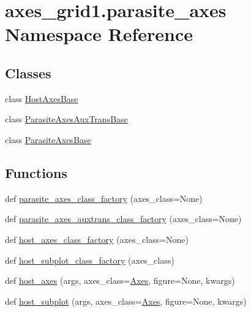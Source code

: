 \hypertarget{namespaceaxes__grid1_1_1parasite__axes}{}\section{axes\+\_\+grid1.\+parasite\+\_\+axes Namespace Reference}
\label{namespaceaxes__grid1_1_1parasite__axes}
\subsection*{Classes}
\begin{DoxyCompactItemize}
\item 
class \hyperlink{classaxes__grid1_1_1parasite__axes_1_1HostAxesBase}{Host\+Axes\+Base}
\item 
class \hyperlink{classaxes__grid1_1_1parasite__axes_1_1ParasiteAxesAuxTransBase}{Parasite\+Axes\+Aux\+Trans\+Base}
\item 
class \hyperlink{classaxes__grid1_1_1parasite__axes_1_1ParasiteAxesBase}{Parasite\+Axes\+Base}
\end{DoxyCompactItemize}
\subsection*{Functions}
\begin{DoxyCompactItemize}
\item 
def \hyperlink{namespaceaxes__grid1_1_1parasite__axes_afbd263cd6096cbf27d51de32acb4edbb}{parasite\+\_\+axes\+\_\+class\+\_\+factory} (axes\+\_\+class=None)
\item 
def \hyperlink{namespaceaxes__grid1_1_1parasite__axes_ab531ed3a5ef2bbcfeecdd1a3be82482c}{parasite\+\_\+axes\+\_\+auxtrans\+\_\+class\+\_\+factory} (axes\+\_\+class=None)
\item 
def \hyperlink{namespaceaxes__grid1_1_1parasite__axes_aad2a9feccd8adae93416c70588325451}{host\+\_\+axes\+\_\+class\+\_\+factory} (axes\+\_\+class=None)
\item 
def \hyperlink{namespaceaxes__grid1_1_1parasite__axes_a622dfda270b0f0222f82112fdbeacd9c}{host\+\_\+subplot\+\_\+class\+\_\+factory} (axes\+\_\+class)
\item 
def \hyperlink{namespaceaxes__grid1_1_1parasite__axes_a4b9af10d8f778f981811c7af670459ac}{host\+\_\+axes} (args, axes\+\_\+class=\hyperlink{classaxes__grid1_1_1mpl__axes_1_1Axes}{Axes}, figure=None, kwargs)
\item 
def \hyperlink{namespaceaxes__grid1_1_1parasite__axes_ac26bf18eb14953db43a73ee0e9d9e096}{host\+\_\+subplot} (args, axes\+\_\+class=\hyperlink{classaxes__grid1_1_1mpl__axes_1_1Axes}{Axes}, figure=None, kwargs)
\end{DoxyCompactItemize}
